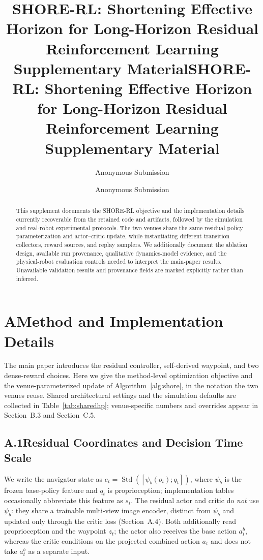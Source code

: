 \documentclass[letterpaper]{article} %
\title{SHORE-RL: Shortening Effective Horizon for Long-Horizon Residual\\
    Reinforcement Learning\\
    \vspace{0.5em}\large Supplementary Material}
\title{SHORE-RL: Shortening Effective Horizon for Long-Horizon Residual\\
    Reinforcement Learning\\
    \vspace{0.5em}\large Supplementary Material}
\author{
    Anonymous Submission
}
\author{
    Anonymous Submission
}
\begin{document}
\maketitle

\begin{abstract}
This supplement documents the SHORE-RL objective and the implementation details
currently recoverable from the retained code and artifacts, followed by the simulation
and real-robot experimental protocols. The two venues share
the same residual policy parameterization and actor--critic update, while instantiating
different transition collectors, reward sources, and replay samplers. We additionally
document the ablation design, available run provenance, qualitative dynamics-model
evidence, and the physical-robot evaluation controls needed to interpret the
main-paper results. Unavailable validation results and provenance fields are marked
explicitly rather than inferred.
\end{abstract}


\section{A\quad Method and Implementation Details}

The main paper introduces the residual controller, self-derived waypoint, and two
dense-reward choices. Here we give the method-level optimization objective and the venue-parameterized update of
Algorithm~\ref{alg:shore}, in the notation the two venues reuse. Shared architectural
settings and the simulation defaults are collected in Table~\ref{tab:sharedhp};
venue-specific numbers and overrides appear in Section~B.3 and Section~C.5.

\subsection{A.1\quad Residual Coordinates and Decision Time Scale}

We write the navigator state as
$e_t=\operatorname{Std}([\psi_b(o_t);q_t])$, where $\psi_b$ is the
frozen base-policy feature and $q_t$ is proprioception; implementation tables
occasionally abbreviate this feature as $s_t$. The residual actor and critic do
\emph{not} use $\psi_b$: they share a trainable multi-view image encoder,
distinct from $\psi_b$ and updated only through the critic loss
(Section~A.4). Both additionally read proprioception and the waypoint $z_t$;
the actor also receives the base action $a_t^b$, whereas the critic conditions
on the projected combined action $a_t$ and does not take $a_t^b$ as a separate
input.
\end{document}
